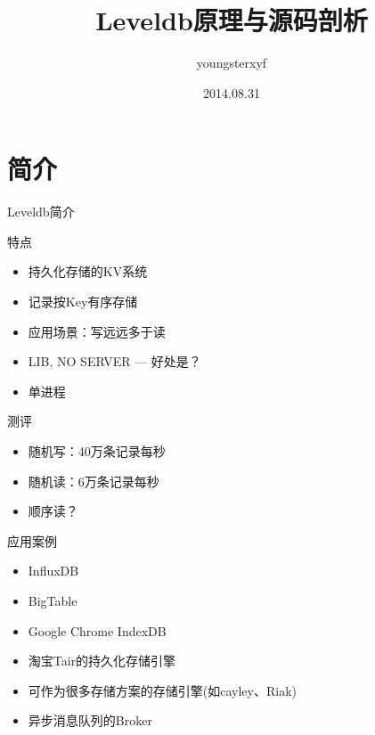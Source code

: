 \documentclass[CJK, 8pt]{beamer}
\begin{document}
\begin{CJK*}{UTF8}{gkai}

\title{Leveldb原理与源码剖析}
\author{youngsterxyf}
\date{2014.08.31}

\begin{frame}[plain]
	\titlepage
\end{frame}

\section{简介}
\begin{frame}{Leveldb简介}
\begin{block}{特点}
	\begin{itemize}
	\item 持久化存储的KV系统
	\item 记录按Key有序存储
	\item 应用场景：写远远多于读
	\item LIB, NO SERVER --- 好处是？
	\item 单进程
	\end{itemize}
\end{block}

\begin{block}{测评}
	\begin{itemize}	
	\item 随机写：40万条记录每秒
	\item 随机读：6万条记录每秒
	\item 顺序读？
	\end{itemize}
\end{block}
\end{frame}

\begin{frame}{应用案例}
\begin{block}{}
	\begin{itemize}
	\item InfluxDB
	\item BigTable
	\item Google Chrome IndexDB
	\item 淘宝Tair的持久化存储引擎
	\item 可作为很多存储方案的存储引擎(如cayley、Riak)
	\item 异步消息队列的Broker
	\end{itemize}
\end{block}
\end{frame}


\end{CJK*}
\end{document}
